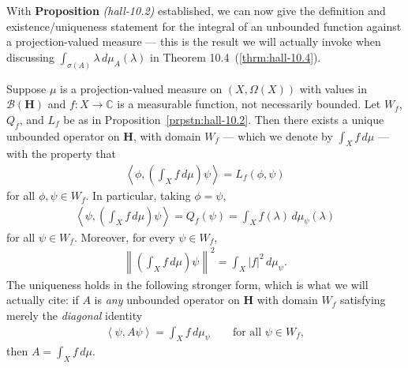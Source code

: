 With \textbf{Proposition} \textit{(hall-10.2)} established, we can now give the definition and existence/uniqueness statement for the integral of an unbounded function against a projection-valued measure — this is the result we will actually invoke when discussing $\int_{\sigma(A)} \lambda \, d\mu_A(\lambda)$ in Theorem 10.4~(\ref{thrm:hall-10.4}).

\begin{proposition}
    \label{prpstn:hall-10.1}
    \leanok
    Suppose $\mu$ is a projection-valued measure on $(X, \Omega(X))$ with values in $\mathcal{B}(\mathbf{H})$ and $f : X \to \mathbb{C}$ is a measurable function, not necessarily bounded. Let $W_f$, $Q_f$, and $L_f$ be as in Proposition~\ref{prpstn:hall-10.2}. Then there exists a unique unbounded operator on $\mathbf{H}$, with domain $W_f$ — which we denote by $\int_X f \, d\mu$ — with the property that
    \begin{align}
        \left< \phi, \left( \int_X f \, d\mu \right) \psi \right> = L_f(\phi, \psi)
    \end{align}
    for all $\phi, \psi \in W_f$. In particular, taking $\phi = \psi$,
    \begin{align}
        \left< \psi, \left( \int_X f \, d\mu \right) \psi \right> = Q_f(\psi) = \int_X f(\lambda) \, d\mu_\psi(\lambda)
    \end{align}
    for all $\psi \in W_f$. Moreover, for every $\psi \in W_f$,
    \begin{align}
        \left\| \left( \int_X f \, d\mu \right) \psi \right\|^2 = \int_X \lvert f \rvert^2 \, d\mu_\psi.
    \end{align}
    The uniqueness holds in the following stronger form, which is what we will actually cite: if $A$ is \textit{any} unbounded operator on $\mathbf{H}$ with domain $W_f$ satisfying merely the \textit{diagonal} identity
    \begin{align}
        \left< \psi, A\psi \right> = \int_X f \, d\mu_\psi \qquad \text{for all } \psi \in W_f,
    \end{align}
    then $A = \int_X f \, d\mu$.
\end{proposition}
